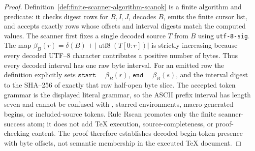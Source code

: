 \documentclass[runningheads]{llncs}
\DeclareRobustCommand{\auditcode}[1]{\mbox{\normalfont\ttfamily\detokenize{#1}}}
\begin{document}
\begin{proof}
Definition~\ref{def:finite-scanner-algorithm-scanok} is a finite algorithm and
predicate: it checks digest rows for \(B,I,J\), decodes \(B\), emits the finite
cursor list, and accepts exactly rows whose offsets and interval digests match
the computed values.  The scanner first fixes a single decoded source \(T\) from
\(B\) using \texttt{utf-8-sig}.  The map
\(\beta_B(r)=\delta(B)+|\operatorname{utf8}(T[0:r])|\) is strictly increasing
because every decoded UTF--8 character contributes a positive number of bytes.
Thus every decoded interval has one raw byte interval.  For an emitted row the
definition explicitly sets \(\texttt{start}=\beta_B(r)\),
\(\texttt{end}=\beta_B(s)\), and the interval digest to the SHA--256 of exactly
that raw half-open byte slice.  The accepted token grammar is the displayed
literal \auditcode{\\begin\{e\}} grammar, so the ASCII prefix interval has
length seven and cannot be confused with
\auditcode{\\begin \{e\}}, starred environments, macro-generated begins, or
included-source tokens.  Rule Rscan promotes only the finite scanner-success
atom; it does not add \TeX{} execution, source-completeness, or proof-checking
content.  The proof therefore establishes decoded begin-token presence with
byte offsets, not semantic membership in the executed \TeX{} document.
\end{proof}
\end{document}
